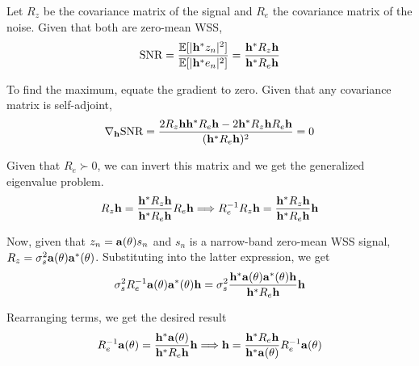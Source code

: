 \documentclass{article}
\begin{document}
    
    Let $R_z$ be the covariance matrix of the signal and $R_e$ the covariance matrix of the noise. Given that both are zero-mean WSS,
    \begin{align}
        \text{SNR}=\frac{\E[|\hh^* z_n|^2]}{\E[|\hh^* e_n|^2]}=\frac{\hh^* R_z \hh}{\hh^* R_e \hh}
    \end{align}
    
    To find the maximum, equate the gradient to zero. Given that any covariance matrix is self-adjoint,
    \begin{align}
        \nabla_{\hh}\text{SNR}=\frac{2R_z \hh \hh^* R_e \hh - 2 \hh^* R_z \hh R_e \hh}{(\hh^* R_e \hh)^2}=0
    \end{align}
    
    Given that $R_e \succ 0$, we can invert this matrix and we get the generalized eigenvalue problem.
    \begin{align}
        R_z \hh = \frac{\hh^* R_z \hh}{\hh^* R_e \hh}R_e \hh \Longrightarrow R_e^{-1}R_z \hh = \frac{\hh^* R_z \hh}{\hh^* R_e \hh}\hh
    \end{align}
    
    Now, given that $z_n=\aa(\theta)s_n$ and $s_n$ is a narrow-band zero-mean WSS signal, $R_z=\sigma_s^2 \aa(\theta)\aa^*(\theta)$. Substituting into the latter expression, we get
    \begin{align}
        \sigma_s^2 R_e^{-1} \aa(\theta)\aa^*(\theta)\hh = \sigma_s^2 \frac{\hh^* \aa(\theta)\aa^*(\theta) \hh}{\hh^* R_e \hh}\hh
    \end{align}
    
    Rearranging terms, we get the desired result
    \begin{align}
        R_e^{-1} \aa(\theta) = \frac{\hh^* \aa(\theta)}{\hh^* R_e \hh}\hh \Longrightarrow \hh = \frac{\hh^* R_e \hh}{\hh^* \aa(\theta)}R_e^{-1} \aa(\theta)
        \end{align}
    
\end{document}
